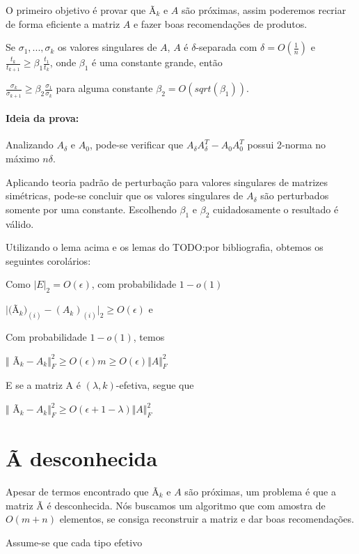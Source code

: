 \documentclass[a4paper,10pt]{article}
\begin{document}
O primeiro objetivo é provar que Ã$_k$ e $A$ são próximas, assim poderemos recriar de forma eficiente a matriz $A$ e fazer boas recomendações de produtos. 

\begin{lema}
 Se $\sigma_1, ..., \sigma_k$ os valores singulares de $A$, $A$ é $\delta$-separada com $\delta = O(\frac{1}{n})$ e $\frac{t_k}{t_{k+1}} \geq \beta_1 \frac{t_1}{t_k}$, onde $\beta_1$ é uma constante grande, então 

$\frac{\sigma_k}{\sigma_{k+1}} \geq \beta_2 \frac{\sigma_1}{\sigma_{k}}$
para alguma constante $\beta_2 = O (sqrt(\beta_1))$.

\end{lema}
\paragraph{Ideia da prova:} Analizando $A_\delta$ e $A_0$, pode-se verificar que $A_\delta A_\delta^T - A_0 A_0^T$ possui 2-norma no máximo $n \delta$.

Aplicando teoria padrão de perturbação para valores singulares de matrizes simétricas, pode-se concluir que os valores singulares de $A_\delta$ são perturbados somente por uma constante. Escolhendo $\beta_1$ e $\beta_2$ cuidadosamente o resultado é válido. 


Utilizando o lema acima e os lemas do TODO:por bibliografia, obtemos os seguintes corolários:
  
\begin{coro} 
Como $\vert E \vert_2 = O(\epsilon)$, com probabilidade  $ 1 - o(1) $

$\vert ($Ã$_k)_{(i)} - (A_k)_{(i)}\vert_2 \geq O(\epsilon)$ e \end{coro}

\begin{coro} Com probabilidade $1- o(1)$, temos 

$\Vert$ Ã$_k - A_k\Vert^2_F \geq O(\epsilon)m \geq O(\epsilon)\Vert A \Vert^2_F $
\end{coro}

E se a matriz A é $(\lambda, k)$-efetiva, segue que 
\begin{coro}

$\Vert$ Ã$_k - A_k\Vert^2_F \geq  O(\epsilon + 1 - \lambda)\Vert A \Vert^2_F $
\end{coro}

\section{Ã desconhecida}

Apesar de termos encontrado que Ã$_k$ e $A$ são próximas, um problema é que a matriz Ã é desconhecida. Nós buscamos um algoritmo que com amostra de $O(m+n)$ elementos, se consiga reconstruir a matriz e dar boas recomendações. 

Assume-se que cada tipo efetivo 



\end{document}
